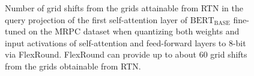 \documentclass{article}
\theoremstyle{plain}
\theoremstyle{definition}
\theoremstyle{remark}
\begin{document}
\begin{figure}
    \vskip -0.1in
    \centering
    \vskip -0.1in
    \caption{Number of grid shifts from the grids attainable from RTN in the query projection of the first self-attention layer of $\text{BERT}_{\text{BASE}}$ fine-tuned on the MRPC dataset when quantizing both weights and input activations of self-attention and feed-forward layers to $8$-bit via FlexRound. FlexRound can provide up to about $60$ grid shifts from the grids obtainable from RTN.}
    \label{fig:A}
    \vskip -0.2in
\end{figure}
\end{document}
